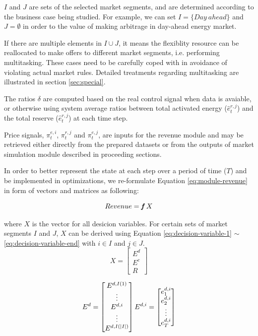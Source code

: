 $I$ and $J$ are sets of the selected market segments, and are determined according to the business case being studied. For example, we can set $I = \{Day~ahead\}$ and $J=\emptyset$ in order to the value of making arbitrage in day-ahead energy market. 

If there are multiple elements in $I \cup J$, it means the flexiblity resource can be reallocated to make offers to different market segments, i.e. performing multitasking. These cases need to be carefully coped with in avoidance of violating actual market rules. Detailed treatments regarding multitasking are illustrated in section \ref{sec:special}.

The ratios $\delta$ are computed based on the real control signal when data is avaiable, or otherwise  using system average ratios between total activated energy ($\hat{e}_t^{r,j}$) and the total reserve ($\hat{e}_t^{r,j}$) at each time step.


Price signals, $\pi_t^{e,i}$, $\pi_t^{r,j}$ and $\pi_t^{e,j}$, are inputs for the revenue module and may be retrieved either directly from the prepared datasets or from the outputs of market simulation module described in proceeding sections.

In order to better represent the state at each step over a period of time ($T$) and be implemented in optimizations, we re-formulate Equation \eqref{eq:module-revenue} in form of vectors and matrices as following:

\begin{equation*}
Revenue = \textit{\textbf{f}}~X
\end{equation*}

where $X$ is the vector for all desicion variables. For certain sets of market segments $I$ and $J$, $X$ can be derived using Equation \eqref{eq:decision-variable-1} $\sim$ \eqref{eq:decision-variable-end} with $i \in I$ and $j \in J$.
\begin{equation}
\label{eq:decision-variable-1}
X =
\begin{bmatrix}
E^d \\ E^c \\ R
\end{bmatrix}
\end{equation}

\begin{equation}
E^d =
\begin{bmatrix}
E^{d,I(1)} \\ \vdots \\ E^{d,i} \\ \vdots \\ E^{d,I(|I|)}
\end{bmatrix} \\
E^{d,i} = 
\begin{bmatrix}
e_1^{d,i}\\e_2^{d,i}\\\vdots\\e_T^{d,i}
\end{bmatrix}
\end{equation}

